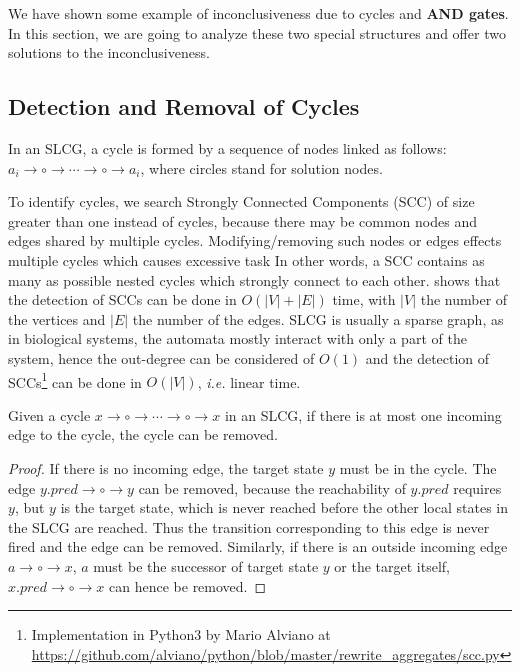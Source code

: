 We have shown some example of inconclusiveness due to cycles and \textbf{AND gates}. 
In this section, we are going to analyze these two special structures and offer two solutions to the inconclusiveness.

\subsection{Detection and Removal of Cycles}\label{sec:cycles}
\begin{definition}[Cycle]
In an SLCG, a cycle is formed by a sequence of nodes linked as follows: $a_i\to \circ \to \cdots \to \circ \to a_i$, where circles stand for solution nodes.
\end{definition}

To identify cycles, we search Strongly Connected Components (SCC) of size greater than one instead of cycles, because there may be common nodes and edges shared by multiple cycles.
Modifying/removing such nodes or edges effects multiple cycles which causes excessive task
In other words, a SCC contains as many as possible nested cycles which strongly connect to each other.
\cite{tarjan1972} shows that the detection of SCCs can be done in $O (|V|+|E|)$ time, with $|V|$ the number of the vertices and $|E|$ the number of the edges.
SLCG is usually a sparse graph, as in biological systems, the automata mostly interact with only a part of the system, hence the out-degree can be considered of $O (1)$ and the detection of SCCs\footnote{Implementation in Python3 by Mario Alviano at \url{https://github.com/alviano/python/blob/master/rewrite_aggregates/scc.py}} can be done in $O(|V|)$, \textit{i.e.} linear time.

\begin{theorem}\label{th:break_cycle}
Given a cycle $x\to \circ \to \cdots \to \circ \to x$ in an SLCG, if there is at most one incoming edge to the cycle, the cycle can be removed.
\end{theorem}

\begin{proof}
If there is no incoming edge, the target state $y$ must be in the cycle. 
The edge $y.pred\to\circ\to y$ can be removed, because the reachability of $y.pred$ requires $y$, but $y$ is the target state, which is never reached before the other local states in the SLCG are reached.
Thus the transition corresponding to this edge is never fired and the edge can be removed.
Similarly, if there is an outside incoming edge $a\to \circ \to x$, $a$ must be the successor of target state $y$ or the target itself, $x.pred\to\circ\to x$ can hence be removed.
\end{proof}

